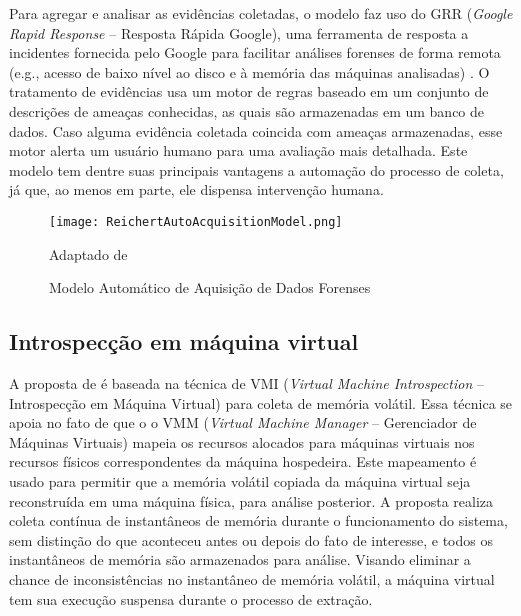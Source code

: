 Para agregar e analisar as evidências coletadas, o modelo faz uso do GRR (\textit{Google Rapid Response} -- Resposta Rápida Google), uma ferramenta de resposta a incidentes fornecida pelo Google para facilitar análises forenses de forma remota (e.g., acesso de baixo nível ao disco e à memória das máquinas analisadas) .
%
O tratamento de evidências usa um motor de regras baseado em um conjunto de descrições de ameaças conhecidas, as quais são armazenadas em um banco de dados.
%
Caso alguma evidência coletada coincida com ameaças armazenadas, esse motor alerta um usuário humano para uma avaliação mais detalhada.
%
Este modelo tem dentre suas principais vantagens a automação do processo de coleta, já que, ao menos em parte, ele dispensa intervenção humana. 

\begin{figure}[htb!]
\footnotesize
\caption{Modelo Automático de Aquisição de Dados Forenses }
\texttt{[image: ReichertAutoAcquisitionModel.png]}
\centering
\label{fig:ReichertAutoAcquisitionModel}
\begin{center}
Adaptado de \cite{ReichertAutoAcquisition:2015} 
\end{center}
\end{figure}


\subsection{Introspecção em máquina virtual}
\label{sec:VMI}

A proposta de \cite{PoiselVMI:2013} é baseada na técnica de VMI (\textit{Virtual Machine Introspection} -- Introspecção em Máquina Virtual) para coleta de memória volátil. 
%
Essa técnica se apoia no fato de que o o VMM (\textit{Virtual Machine Manager} -- Gerenciador de Máquinas Virtuais) mapeia os recursos alocados para máquinas virtuais nos recursos físicos correspondentes da máquina hospedeira.
%
Este mapeamento é usado para permitir que a memória volátil copiada da máquina virtual seja reconstruída em uma máquina física, para análise posterior.
%
A proposta realiza coleta contínua de instantâneos de memória durante o funcionamento do sistema, sem distinção do que aconteceu antes ou depois do fato de interesse, e todos os instantâneos de memória são armazenados para análise.
%
Visando eliminar a chance de inconsistências no instantâneo de memória volátil, a máquina virtual tem sua execução suspensa durante o processo de extração.


